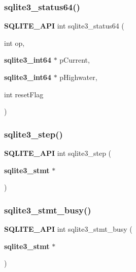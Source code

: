 \mbox{\label{sqlite3_8h_a29974a4a0bea29c473288ef1e5d80f80}} 
\subsubsection{sqlite3\_status64()}
{\footnotesize\ttfamily \textbf{ S\+Q\+L\+I\+T\+E\+\_\+\+A\+PI} int sqlite3\+\_\+status64 (\begin{DoxyParamCaption}\item[{int}]{op,  }\item[{\textbf{ sqlite3\+\_\+int64} $\ast$}]{p\+Current,  }\item[{\textbf{ sqlite3\+\_\+int64} $\ast$}]{p\+Highwater,  }\item[{int}]{reset\+Flag }\end{DoxyParamCaption})}

\mbox{\label{sqlite3_8h_ac1e491ce36b7471eb28387f7d3c74334}} 
\subsubsection{sqlite3\_step()}
{\footnotesize\ttfamily \textbf{ S\+Q\+L\+I\+T\+E\+\_\+\+A\+PI} int sqlite3\+\_\+step (\begin{DoxyParamCaption}\item[{\textbf{ sqlite3\+\_\+stmt} $\ast$}]{ }\end{DoxyParamCaption})}

\mbox{\label{sqlite3_8h_ae4b517143b8a9a6643b306affd809509}} 
\subsubsection{sqlite3\_stmt\_busy()}
{\footnotesize\ttfamily \textbf{ S\+Q\+L\+I\+T\+E\+\_\+\+A\+PI} int sqlite3\+\_\+stmt\+\_\+busy (\begin{DoxyParamCaption}\item[{\textbf{ sqlite3\+\_\+stmt} $\ast$}]{ }\end{DoxyParamCaption})}

\mbox{\label{sqlite3_8h_ab3110f59f66768980a6d57dac579030d}} 

